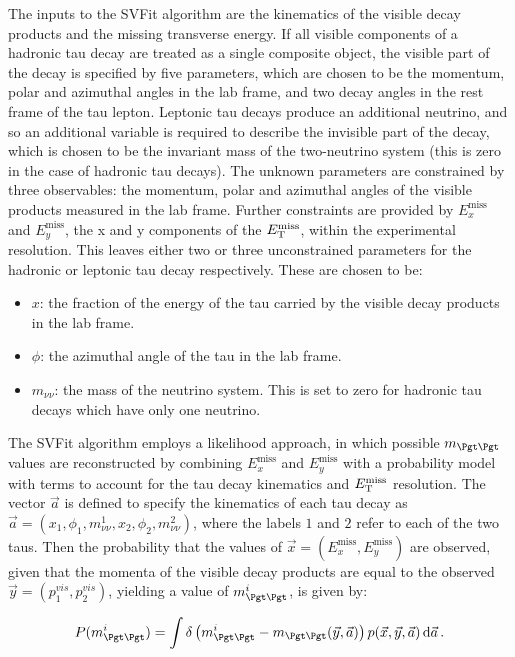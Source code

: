 The inputs to the SVFit algorithm are the kinematics of the visible decay
products and the missing transverse energy. If all visible components of a
hadronic tau decay are treated as a single composite object, the visible part of
the decay is specified by five parameters, which are chosen to be the momentum,
polar and azimuthal angles in the lab frame, and two decay angles in the rest
frame of the tau lepton. Leptonic tau decays produce an additional neutrino, and so an additional
variable is required to describe the invisible part of the decay, 
which is chosen to be the invariant mass of the
two-neutrino system (this is zero in the case of hadronic tau decays). 
The unknown parameters are constrained by three
observables: the momentum, polar and azimuthal angles of the visible products
measured in the lab frame. Further constraints are provided by
$E_{x}^{\text{miss}}$ and $E_{y}^{\text{miss}}$, the x and y components of the
$E_{\mathrm{T}}^{\text{miss}}$, within the experimental resolution. This leaves either two or three 
unconstrained parameters for the hadronic or leptonic tau decay respectively. 
These are chosen to be:

\begin{itemize}
\item $x$: the fraction of the energy of the tau carried by the visible decay
products in the lab frame.
\item $\phi$: the azimuthal angle of the tau in the lab frame. 
\item $m_{\nu\nu}$: the mass of the neutrino system. This is set to zero for hadronic tau
decays which have only one neutrino.
\end{itemize}

The SVFit algorithm employs a likelihood approach, in which possible
$m_{\Pgt\Pgt}$ values are reconstructed by combining $E_{x}^{\text{miss}}$ and
$E_{y}^{\text{miss}}$ with a probability model with terms to account for the tau
decay kinematics and $E_{\mathrm{T}}^{\text{miss}}$ resolution. The vector $\vec{a}$ is defined to
specify the kinematics of each tau decay as $\vec{a} =
\left(x_{1},\phi_{1},m_{\nu\nu}^{1},x_{2},\phi_{2},m_{\nu\nu}^{2}\right)$, where
the labels $1$ and $2$ refer to each of the two taus. Then the
probability that the values of $\vec{x} = \left(E_{x}^{\text{miss}},
E_{y}^{\text{miss}}\right)$ are observed, given that the momenta of the visible decay products are
equal to the observed $\vec{y} = \left(p_{1}^{vis},p_{2}^{vis} \right)$,
yielding a value of $m_{\Pgt\Pgt}^{i}$, is given by: 

\begin{equation} \label{eqn:svfit-prob}
P(m_{\Pgt\Pgt}^{i}) = \int\delta\left(m_{\Pgt\Pgt}^{i} -
m_{\Pgt\Pgt}(\vec{y},\vec{a})\right)p(\vec{x},\vec{y},\vec{a})\,\text{d}\vec{a}\,
.
\end{equation}

